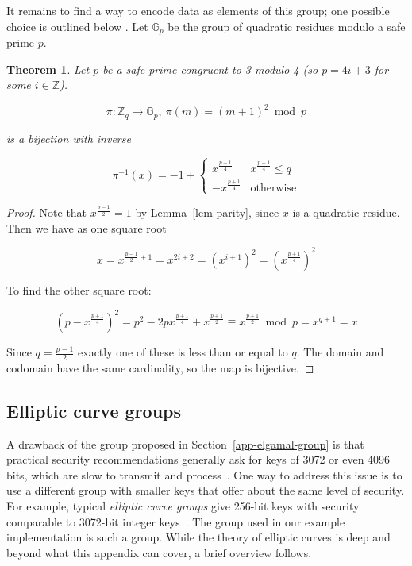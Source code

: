 \documentclass[12pt,a4paper]{article}
\newtheorem{theorem}{Theorem}
\theoremstyle{definition}
\begin{document}
It remains to find a way to encode data as elements of this group; one possible choice is outlined below \cite{katz2014introduction}. Let $\mathbb{G}_p$ be the group of quadratic residues modulo a safe prime $p$.
\begin{theorem}
    Let $p$ be a safe prime congruent to 3 modulo 4 (so $p=4i+3$ for some $i\in\mathbb{Z}$).

    $$\pi:\mathbb{Z}_q\rightarrow\mathbb{G}_p,\ \pi(m)=(m+1)^2\bmod p$$

    is a bijection with inverse

    $$\pi^{-1}(x)=-1+\begin{cases}
        x^\frac{p+1}{4} & x^\frac{p+1}{4}\leq q\\
        -x^\frac{p+1}{4}&\text{otherwise}
    \end{cases}$$

\end{theorem}
\begin{proof}
    Note that $x^\frac{p-1}{2}=1$ by Lemma~\ref{lem-parity}, since $x$ is a quadratic residue. Then we have as one square root

    $$x=x^{\frac{p-1}{2}+1}=x^{2i+2}=(x^{i+1})^2=\left(x^\frac{p+1}{4}\right)^2$$

    To find the other square root:

    $$\left(p-x^\frac{p+1}{4}\right)^2=p^2-2px^\frac{p+1}{4}+x^\frac{p+1}{2}\equiv x^\frac{p+1}{2}\bmod p=x^{q+1}=x$$

    Since $q=\frac{p-1}{2}$ exactly one of these is less than or equal to $q$. The domain and codomain have the same cardinality, so the map is bijective.



\end{proof}

\subsection{Elliptic curve groups}
A drawback of the group proposed in Section~\ref{app-elgamal-group} is that practical security recommendations generally ask for keys of 3072 or even 4096 bits, which are slow to transmit and process~\cite{barker2018transitioning}. One way to address this issue is to use a different group with smaller keys that offer about the same level of security. For example, typical \textit{elliptic curve groups} give 256-bit keys with security comparable to 3072-bit integer keys~\cite{bafandehkar2013comparison}. The group used in our example implementation is such a group. While the theory of elliptic curves is deep and beyond what this appendix can cover, a brief overview follows.
\end{document}
